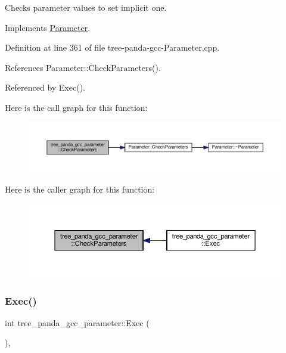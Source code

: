 Checks parameter values to set implicit one. 



Implements \hyperlink{classParameter_a87315799c1a893687f796890f5d4f44d}{Parameter}.



Definition at line 361 of file tree-\/panda-\/gcc-\/\+Parameter.\+cpp.



References Parameter\+::\+Check\+Parameters().



Referenced by Exec().

Here is the call graph for this function\+:
\nopagebreak
\begin{figure}[H]
\begin{center}
\leavevmode
\includegraphics[width=350pt]{da/df6/classtree__panda__gcc__parameter_a848c8dc5dc64dbd6344d3b0a99f3617b_cgraph}
\end{center}
\end{figure}
Here is the caller graph for this function\+:
\nopagebreak
\begin{figure}[H]
\begin{center}
\leavevmode
\includegraphics[width=350pt]{da/df6/classtree__panda__gcc__parameter_a848c8dc5dc64dbd6344d3b0a99f3617b_icgraph}
\end{center}
\end{figure}
\mbox{\label{classtree__panda__gcc__parameter_a059ff6cba08daf6710ffa46b2c97e2ee}} 
\subsubsection{\texorpdfstring{Exec()}{Exec()}}
{\footnotesize\ttfamily int tree\+\_\+panda\+\_\+gcc\+\_\+parameter\+::\+Exec (\begin{DoxyParamCaption}{ }\end{DoxyParamCaption})\hspace{0.3cm}{\ttfamily [override]}, {\ttfamily [virtual]}}



